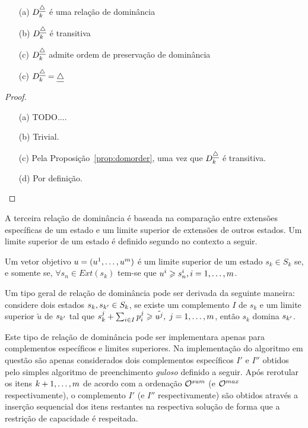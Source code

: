 \begin{myprop}
  \noindent
  \begin{enumerate}
    \item[(a)] $D_k^{\underline{\triangle}}$ é uma relação de dominância
    \item[(b)] $D_k^{\underline{\triangle}}$ é transitiva
    \item[(c)] $D_k^{\underline{\triangle}}$ admite ordem de preservação de dominância
    \item[(c)] $D_k^{\underline{\triangle}} = \underline{\triangle}$
\end{enumerate}
\end{myprop}

\begin{proof}
  \noindent
  \begin{enumerate}
    \item[(a)]{ TODO.... }
    \item[(b)]{Trivial.}
    \item[(c)]{Pela Proposição~\ref{prop:domorder}, uma vez que $D_k^{\underline{\triangle}}$ é transitiva.}
    \item[(d)]{Por definição.} \qedhere
  \end{enumerate}
\end{proof}
A terceira relação de dominância é baseada na comparação entre extensões
específicas de um estado e um limite superior de extensões de outros estados.
Um limite superior de um estado é definido segundo no contexto a seguir.

\begin{mydef}
  Um vetor objetivo $u = (u^1, \ldots, u^m)$ é um limite superior
  de um estado $s_k \in S_k$ se, e somente se, $\forall s_n \in Ext(s_k)$
  tem-se que $u^i \geqslant s_n^i, i = 1, \ldots, m$.
\end{mydef}

Um tipo geral de relação de dominância pode ser derivada da seguinte maneira:
considere dois estados $s_k, s_{{k'}} \in S_k$, se existe um complemento
$I$ de $s_k$ e um limite superior $\tilde{u}$ de $s_{{k'}}$ tal que
$s_k^j + \sum_{i \in I} p_i^j \geqslant \tilde{u^j},\; j = 1, \ldots, m$,
então $s_k$ domina $s_{{k'}}$.

Este tipo de relação de dominância pode ser implementara apenas para
complementos específicos e limites superiores.
Na implementação do algoritmo em questão são apenas considerados
dois complementos específicos $I'$ e $I''$ obtidos pelo simples algoritmo
de preenchimento \emph{guloso} definido a seguir.
Após rerotular os itens $k+1, \ldots, m$ de acordo com a ordenação
$\mathcal{O}^{sum}$ (e $\mathcal{O}^{max}$ respectivamente), o complemento $I'$
(e $I''$ respectivamente) são obtidos através a inserção sequencial
dos itens restantes na respectiva solução de forma que a restrição
de capacidade é respeitada.


